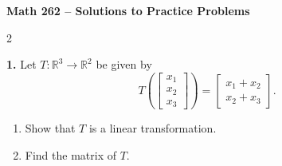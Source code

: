 \documentclass[8pt]{extarticle}
\begin{document}
\scriptsize

\begin{center}
  \normalsize\textbf{Math 262 -- Solutions to Practice Problems}
\end{center}

\begin{multicols}{2}
\raggedcolumns

\begin{tcolorbox}[title=]
\noindent
\textbf{1.} Let \( T:\mathbb{R}^3 \to \mathbb{R}^2 \) be given by
\[
T\!\left(\begin{bmatrix}x_{1}\\x_{2}\\x_{3}\end{bmatrix}\right)
=\begin{bmatrix}x_{1}+x_{2}\\ x_{2}+x_{3}\end{bmatrix}.
\]
\begin{enumerate}
\item[(a)] Show that \(T\) is a linear transformation.
\item[(b)] Find the matrix of \(T\).
\end{enumerate}


\end{tcolorbox}
\end{multicols}
\end{document}
